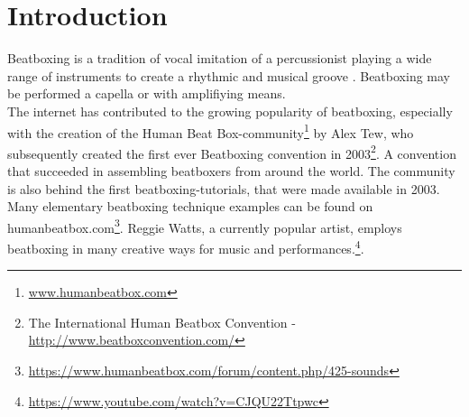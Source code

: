\section{ Introduction }
Beatboxing is a tradition of vocal imitation of a percussionist playing a wide range of instruments to create a rhythmic and musical groove \citep{Stowell2008}. 
Beatboxing may be performed a capella or with amplifiying means\citep{Stowell2008}. \\The internet has contributed to the growing popularity of beatboxing, especially with the creation of the Human Beat Box-community\footnote{\url{www.humanbeatbox.com}} by Alex Tew, who subsequently created the first ever Beatboxing convention in 2003\footnote{The International Human Beatbox Convention - \url{http://www.beatboxconvention.com/}}. A convention that succeeded in assembling beatboxers from around the world. The community is also behind the first beatboxing-tutorials, that were made available in 2003. Many elementary beatboxing technique examples can be found on humanbeatbox.com\footnote{\url{https://www.humanbeatbox.com/forum/content.php/425-sounds}}. Reggie Watts, a currently popular artist, employs beatboxing in many creative ways for music and performances.\footnote{\url{https://www.youtube.com/watch?v=CJQU22Ttpwc}}.

